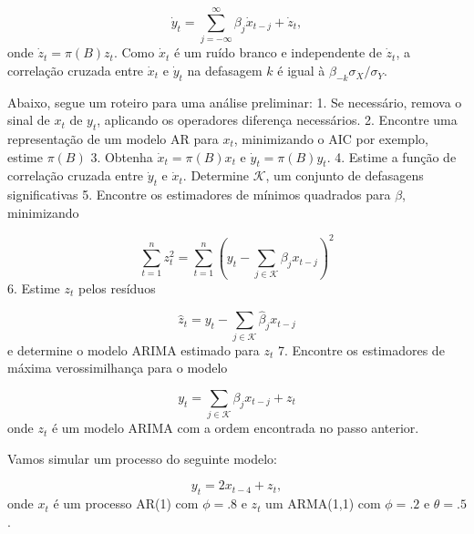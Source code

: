 \documentclass[
  letterpaper,
  DIV=11,
  numbers=noendperiod]{scrartcl}
\theoremstyle{plain}
\theoremstyle{plain}
\theoremstyle{definition}
\theoremstyle{definition}
\theoremstyle{remark}
\begin{document}
\[\dot{y}_t=\sum_{j=-\infty}^\infty \beta_j \dot{x}_{t-j}+\dot{z}_t,\]
onde \(\dot{z}_t=\pi(B)z_t\). Como \(\dot{x}_t\) é um ruído branco e
independente de \(\dot{z}_t\), a correlação cruzada entre \(\dot{x}_t\)
e \(\dot{y}_t\) na defasagem \(k\) é igual à
\(\beta_{-k}\sigma_{\dot{X}}/\sigma_{\dot{Y}}.\)

Abaixo, segue um roteiro para uma análise preliminar: 1. Se necessário,
remova o sinal de \(x_t\) de \(y_t\), aplicando os operadores diferença
necessários. 2. Encontre uma representação de um modelo AR para \(x_t\),
minimizando o AIC por exemplo, estime \(\pi(B)\) 3. Obtenha
\(\dot{x}_t=\pi(B)x_t\) e \(\dot{y}_t=\pi(B)y_t.\) 4. Estime a função de
correlação cruzada entre \(\dot{y}_t\) e \(\dot{x}_t\). Determine
\(\mathcal{K}\), um conjunto de defasagens significativas 5. Encontre os
estimadores de mínimos quadrados para \(\beta\), minimizando

\[\sum_{t=1}^n z_t^2=\sum_{t=1}^n\left(y_t-\sum_{j\in\mathcal{K}}\beta_j x_{t-j}\right)^2\]
6. Estime \(z_t\) pelos resíduos

\[\hat{z}_t=y_t-\sum_{j\in\mathcal{K}}\hat{\beta}_j x_{t-j}\] e
determine o modelo ARIMA estimado para \(z_t\) 7. Encontre os
estimadores de máxima verossimilhança para o modelo

\[y_t=\sum_{j\in\mathcal{K}} \beta_j x_{t-j}+z_t\] onde \(z_t\) é um
modelo ARIMA com a ordem encontrada no passo anterior.

\leavevmode{}%
Vamos simular um processo do seguinte modelo:

\[y_t = 2x_{t-4}+z_t,\] onde \(x_t\) é um processo AR(1) com \(\phi=.8\)
e \(z_t\) um ARMA(1,1) com \(\phi=.2\) e \(\theta=.5\).
\end{document}
